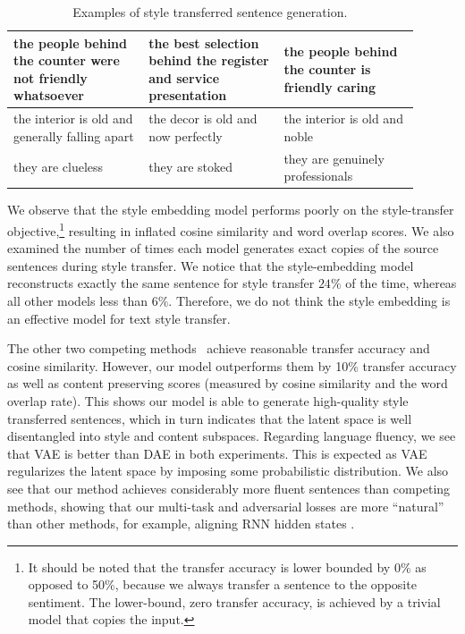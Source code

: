 \documentclass[letterpaper]{article} %
\begin{document}
\begin{table}[!t]
{\begin{tabular}{| p{0.3\linewidth} || p{0.3\linewidth} | p{0.3\linewidth} |}
			\hline
			the people behind the counter were not friendly whatsoever              & the best selection behind the register and service presentation           & the people behind the counter is friendly caring           \\
			\hline
			the interior is old and generally falling apart                         & the decor is old and now perfectly                                        & the interior is old and noble                              \\
			\hline
			they are clueless                                                       & they are stoked                                                           & they are genuinely professionals                           \\
			\hline
		\end{tabular}}\vspace{-.2cm}
	\caption{Examples of style transferred sentence generation.}\vspace{-.2cm}
	\label{tab:transfer-samples}
\end{table}

We observe that the style embedding model \cite{fu2018style} performs poorly on the style-transfer objective,\footnote{It should be noted that the transfer accuracy is lower bounded by 0\% as opposed to 50\%, because we always transfer a sentence to the opposite sentiment. The lower-bound, zero transfer accuracy, is achieved by a trivial model that copies the input.} resulting in inflated cosine similarity and word overlap scores. We also examined the number of times each model generates exact copies of the source sentences during style transfer. We notice that the style-embedding model reconstructs exactly the same sentence for style transfer $24\%$ of the time, whereas all other models less than $6\%$. Therefore, we do not think the style embedding is an effective model for text style transfer.

The other two competing methods~\cite{shen2017style,zhao2018adversarially} achieve reasonable transfer accuracy and cosine similarity. However, our model outperforms them by 10\% transfer accuracy as well as content preserving scores (measured by cosine similarity and the word overlap rate). This shows our model is able to generate high-quality style transferred sentences, which in turn indicates that the  latent space  is well disentangled into style and content subspaces. Regarding language fluency, we see that VAE is better than DAE in both experiments. This is expected as VAE regularizes the latent space by imposing some probabilistic distribution. We also see that our method achieves considerably more fluent sentences than competing methods, showing that our multi-task and adversarial losses are more ``natural'' than other methods, for example, aligning RNN hidden states \cite{shen2017style}.
\end{document}
